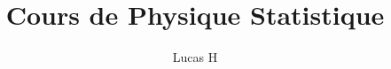 \documentclass[a4paper,12pt]{report}
\begin{document}
\newtheorem*{thm}{Théorème}

\newtheorem*{definition}{Définition}
\author{Lucas H}
\title{Cours de Physique Statistique}



\maketitle
\tableofcontents




\end{document}
